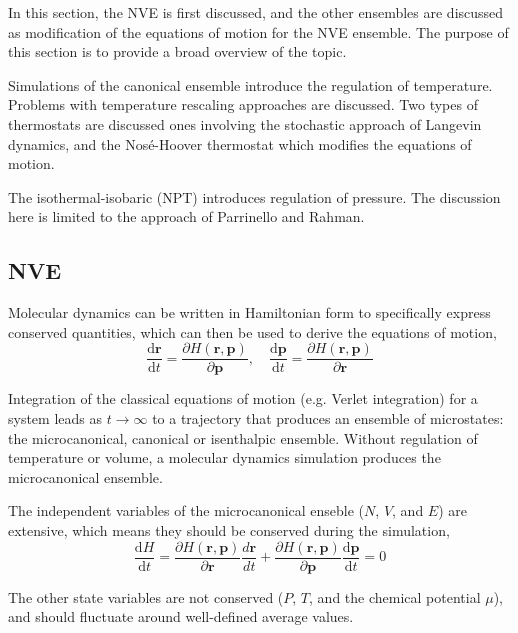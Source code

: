   In this section, the NVE is first discussed, and the other ensembles are discussed as modification of the equations of motion for the NVE ensemble.  The purpose of this section is to provide a broad overview of the topic.

Simulations of the canonical ensemble introduce the regulation of temperature.  Problems with temperature rescaling approaches are discussed.  Two types of thermostats are discussed ones involving the stochastic approach of Langevin dynamics, and the Nos\'e-Hoover thermostat\cite{hoover1985_npt} which modifies the equations of motion.

The isothermal-isobaric (NPT) introduces regulation of pressure.  The discussion here is limited to the approach of Parrinello and Rahman\cite{parrinello1981_barostat}.

\subsection{NVE}
Molecular dynamics can be written in Hamiltonian form to specifically express conserved quantities\cite{allen1987_md}, which can then be used to derive the equations of motion,
\begin{equation}
	\frac{\mathrm{d} \bm{r}}
	     {\mathrm{d} t}
	=
	\frac{\partial H(\bm{r},\bm{p})}
	     {\partial \bm{p}},
	\quad
	\frac{\mathrm{d} \bm{p}}
	     {\mathrm{d} t}
	=
	\frac{\partial H(\bm{r},\bm{p})}
	     {\partial \bm{r}}
\end{equation}

Integration of the classical equations of motion (e.g. Verlet integration) for a system leads as {$t \rightarrow \infty$} to a trajectory that produces an ensemble of microstates: the microcanonical, canonical or isenthalpic ensemble.  Without regulation of temperature or volume, a molecular dynamics simulation produces the microcanonical ensemble.

  The independent variables of the microcanonical enseble ($N$, $V$, and $E$) are extensive, which means they should be conserved during the simulation,
\begin{equation}
	\frac{\mathrm{d} H}
	     {\mathrm{d} t}
	=
	\frac{\partial H(\bm{r},\bm{p})}
	     {\partial \bm{r}} \frac{d\bm{r}}{dt}
	+
	\frac{\partial H(\bm{r},\bm{p})}
	     {\partial \bm{p}}
	\frac{\mathrm{d} \bm{p}}
	     {\mathrm{d} t}
	= 0
\end{equation}

  The other state variables are not conserved ($P$, $T$, and the chemical potential $\mu$), and should fluctuate around well-defined average values.


